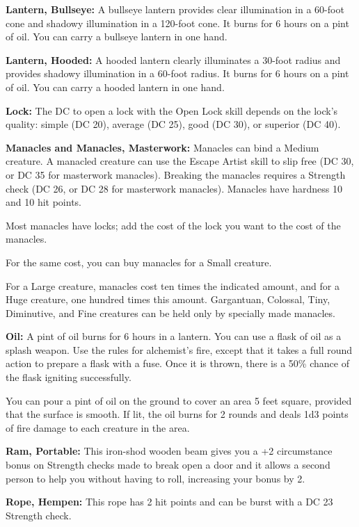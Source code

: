 \documentclass{article}
\begin{document}
\textbf{Lantern, Bullseye:} A bullseye lantern provides clear illumination in a 
60-foot cone and shadowy illumination in a 120-foot cone. It burns for 6 hours 
on a pint of oil. You can carry a bullseye lantern in one hand.

\textbf{Lantern, Hooded:} A hooded lantern clearly illuminates a 30-foot radius 
and provides shadowy illumination in a 60-foot radius. It burns for 6 hours on 
a pint of oil. You can carry a hooded lantern in one hand.

\textbf{Lock:} The DC to open a lock with the Open Lock skill depends on the lock's 
quality: simple (DC 20), average (DC 25), good (DC 30), or superior (DC 40).

\textbf{Manacles and Manacles, Masterwork:} Manacles can bind a Medium creature. 
A manacled creature can use the Escape Artist skill to slip free (DC 30, or DC 
35 for masterwork manacles). Breaking the manacles requires a Strength check (DC 
26, or DC 28 for masterwork manacles). Manacles have hardness 10 and 10 hit points.

Most manacles have locks; add the cost of the lock you want to the cost of the 
manacles.

For the same cost, you can buy manacles for a Small creature.

For a Large creature, manacles cost ten times the indicated amount, and for a Huge 
creature, one hundred times this amount. Gargantuan, Colossal, Tiny, Diminutive, 
and Fine creatures can be held only by specially made manacles.

\textbf{Oil:} A pint of oil burns for 6 hours in a lantern. You can use a flask 
of oil as a splash weapon. Use the rules for alchemist's fire, except that it takes 
a full round action to prepare a flask with a fuse. Once it is thrown, there is 
a 50\% chance of the flask igniting successfully.

You can pour a pint of oil on the ground to cover an area 5 feet square, provided 
that the surface is smooth. If lit, the oil burns for 2 rounds and deals 1d3 points 
of fire damage to each creature in the area.

\textbf{Ram, Portable:} This iron-shod wooden beam gives you a +2 circumstance 
bonus on Strength checks made to break open a door and it allows a second person 
to help you without having to roll, increasing your bonus by 2.

\textbf{Rope, Hempen:} This rope has 2 hit points and can be burst with a DC 23 
Strength check.
\end{document}
